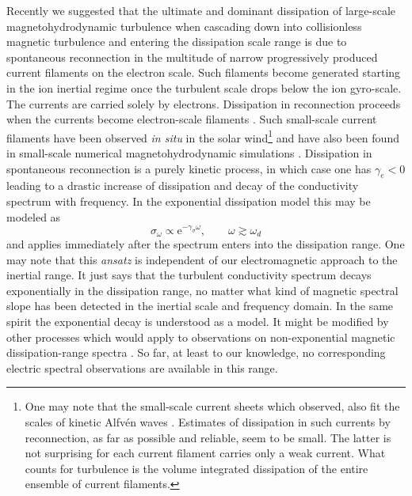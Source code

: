 \documentclass[ ]{copernicus2}
\begin{document}
{{{Recently we suggested \citep{treumann2015} that the {ultimate and dominant dissipation of large-scale magnetohydrodynamic turbulence when cascading down into collisionless magnetic turbulence and entering the dissipation scale range is due to spontaneous reconnection in the multitude of narrow progressively produced current filaments on the electron scale.} Such filaments become generated starting in the ion inertial regime once the turbulent scale drops below the ion gyro-scale. The currents are carried solely by electrons. Dissipation in reconnection proceeds when the currents become electron-scale filaments  \citep[cf., also,][who instead of reconnection make kinetic Alfv\'en waves and whistlers responsible for the dissipation, a quasilinear substantially less violent process]{boldyr2013}. Such small-scale current filaments have been observed \emph{in situ} in the solar wind\footnote{One may note that the small-scale current sheets which \cite{perri2012} observed, also fit the scales of kinetic Alfv\'en waves \citep{sahraoui2009,sahraoui2012}. Estimates of dissipation in such currents by reconnection, as far as possible and reliable, seem to be small. The latter is not surprising for each current filament carries only a weak current. What counts for turbulence is the volume integrated dissipation of the entire ensemble of current filaments.} \citep{perri2012} and have also been found in small-scale numerical magnetohydrodynamic simulations \citep[cf., e.g.,][where they are again interpreted as kinetic Alfv\'en wave structures, not currents]{zhdankin2014}. Dissipation in spontaneous reconnection is a purely kinetic process, in which case one has $\gamma_e<0$ leading to a {drastic increase of dissipation and decay of the conductivity spectrum with frequency. In the exponential dissipation model this may be modeled as}
\begin{equation}
\sigma_\omega\propto\mathrm{e}^{-\gamma_\sigma\omega}, \qquad \omega\gtrsim\omega_d
\end{equation}
{and applies immediately after the spectrum enters into the dissipation range. One may note that this \emph{ansatz} is independent of our electromagnetic approach to the inertial range. It just says that the turbulent conductivity spectrum decays exponentially in the dissipation range, no matter what kind of magnetic spectral slope has been detected in the inertial scale and frequency domain. In the same spirit the exponential decay is understood as a model. It might be modified by other processes which would apply to observations on non-exponential magnetic dissipation-range spectra \citep[cf., e.g.,][and others]{alexandrova2009}. So far, at least to our knowledge, no corresponding electric spectral observations are available in this range.} 

}}}
\end{document}
